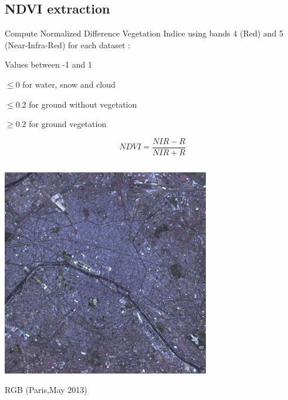 \documentclass[c]{beamer}
\begin{document}
\subsection{NDVI extraction}
\begin{frame}
\tableofcontents[currentsubsection]
\end{frame}

\begin{frame}
\begin{itemize}
{
 \item Compute Normalized Difference Vegetation Indice using bands 4 (Red) and 5 (Near-Infra-Red) for each dataset :
 \item Values between -1 and 1
 \item $\leq 0$ for water, snow and cloud
 \item $\leq 0.2$ for  ground without vegetation
 \item $\geq 0.2$ for ground vegetation
}
\end{itemize}
{\scriptsize \[NDVI=\frac{NIR-R}{NIR+R}\]}
\begin{columns}
 \begin{column}{0.33\textwidth}
  \begin{overlayarea}{\linewidth}{2cm}
  \centering\vfill
  \includegraphics[scale=0.15]{images/Paris/05_rgb.png}
  \end{overlayarea}
  \begin{overlayarea}{\linewidth}{0.5cm}
  \centering
  \tiny RGB (Paris,May 2013) \par
  \end{overlayarea}
 \end{column}
  \begin{column}{0.33\textwidth}

\end{column}
\end{columns}
\end{frame}
\end{document}
